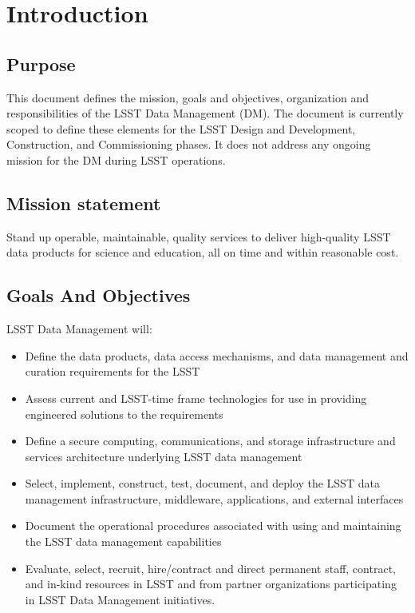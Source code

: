 \section{Introduction}
\subsection{Purpose}
This document defines the mission, goals and objectives, organization and responsibilities of the LSST Data Management (DM).  The document is currently scoped to define these elements for the LSST Design and Development, Construction, and Commissioning phases.  It does not address any ongoing mission for the DM during LSST operations.

\subsection{Mission statement}
Stand up operable, maintainable, quality services to deliver high-quality LSST data products for science and education, all on time and within reasonable cost.

\subsection{Goals And Objectives}
LSST Data Management will:
\begin{itemize}
\item Define the data products, data access mechanisms, and data management and curation requirements for the LSST
\item Assess current and LSST-time frame technologies for use in providing engineered solutions to the requirements
\item Define a secure computing, communications, and storage infrastructure and services architecture underlying LSST data management
\item Select, implement, construct, test, document, and deploy the LSST data management infrastructure, middleware, applications, and external interfaces
\item Document the operational procedures associated with using and maintaining the LSST data management capabilities
\item Evaluate, select, recruit, hire/contract and direct permanent staff, contract, and in-kind resources in LSST and from partner organizations participating in LSST Data Management initiatives.

\end{itemize}


